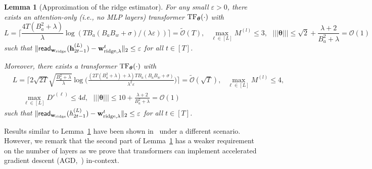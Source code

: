 \documentclass[10pt]{article}
\newtheorem{lemma}[theorem]{Lemma}
\newcommand{\eps}{\varepsilon}
\renewcommand{\cO}{\mathcal{O}}
\newcommand{\<}{\left\langle}
\renewcommand{\>}{\right\rangle}
\newcommand{\lth}{{(\ell)}}
\newcommand{\TF}{{\rm TF}}
\renewcommand{\read}{{\sf read}}
\newcommand{\ridge}{{\rm ridge}}
\newcommand{\nrmp}[1]{{\left|\!\left|\!\left|{#1}\right|\!\right|\!\right|}}
\newcommand{\tcO}{{\tilde{\mathcal O}}}
\newcommand{\hidden}{{D'}}
\def\btheta{{\boldsymbol \theta}}
\def\bh{{\mathbf h}}
\def\bw{{\mathbf w}}
\begin{document}
\begin{lemma}[Approximation of the ridge estimator]\label{lm:approx_ridge}
For any small $\eps>0$, there exists an attention-only (i.e., no MLP layers) transformer $\TF_\btheta(\cdot)$ with 
$$L=\Big\lceil\frac{4T(B_a^2+\lambda)}{\lambda}\log({TB_a(B_aB_w+\sigma)}/({\lambda}\eps))\Big\rceil=\tcO(T),~~~\max_{\ell\in[L]}M^{(l)}\leq3,~~~ \nrmp{\btheta}\leq  \sqrt{2}+\frac{\lambda+2}{B_a^2+\lambda}=\cO(1)$$ such that $\|\read_{\bw_{\ridge}}(\bh_{2t-1}^{(L)})-\bw^t_{\ridge,\lambda}\|_2\leq\eps$ for all $t\in[T]$. 

Moreover, there exists a  transformer $\TF_\btheta(\cdot)$ with  \begin{align*}&L=\Big\lceil2\sqrt{2T}\sqrt{\frac{B_a^2+\lambda}{\lambda}}\log\Big(\frac{(2T(B_a^2+\lambda)+\lambda)TB_a(B_aB_w+\sigma)}{\lambda^2\eps}\Big)\Big\rceil=\tcO(\sqrt{T}),~~~\max_{\ell\in[L]}M^{(l)}\leq4,~~~ \\
&~~~~~~\max_{\ell\in[L]}\hidden^{\lth}\leq 4d,~~~\nrmp{\btheta}\leq  10+\frac{\lambda+2}{B_a^2+\lambda}=\cO(1) \end{align*}
 such that $\|\read_{\bw_{\ridge}}(h_{2t-1}^{(L)})-\bw^t_{\ridge,\lambda}\|_2\leq\eps$ for all $t\in[T]$. 
\end{lemma}



Results similar to Lemma~\ref{lm:approx_ridge} have been shown in~\cite{bai2023transformers} under a different scenario.   However, we remark that  the second part of Lemma~\ref{lm:approx_ridge} has a weaker requirement on the number of layers as we prove that transformers can implement accelerated gradient descent (AGD,~\cite{nesterov2003introductory}) in-context.
\end{document}
